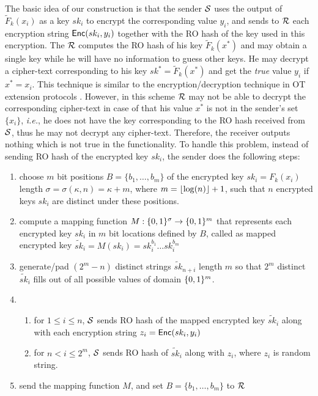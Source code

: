 The basic idea of our \OPPRF construction is that the sender $\mathcal{S}$ uses the output of $\widetilde F_k(x_i)$ as a key $sk_i$ to encrypt the corresponding value $y_i$, and sends to $\mathcal{R}$ each encryption string $\mathsf{Enc}(sk_i,y_i)$ together with the RO hash of the key used in this encryption.  The $\mathcal{R}$ computes the RO hash of his key $\widetilde F_k(x^*)$ and may obtain a single key while he will have no information to guess other keys. He may decrypt a cipher-text corresponding to his key $sk^*=\widetilde F_k(x^*)$ and get the \textit{true} value $y_i$ if $x^*=x_i$.   This technique is similar to the encryption/decryption technique in OT extension protocols \cite{C:IKNP03,C:KolKum13}. However, in this scheme $\mathcal{R}$ may not be able to decrypt the corresponding cipher-text in case of that his value $x^*$ is not in the sender's set $\{x_i\}$, \textit{i.e.},  he does not have the key corresponding to the RO hash received from $\mathcal{S}$, thus he may not decrypt any cipher-text. Therefore, the receiver outputs nothing which is not true in the \OPPRF functionality. To handle this problem, instead of sending RO hash of the encrypted key $sk_i$, the sender does the following steps:
\begin{enumerate}
	\item  choose $m$ bit positions $B=\{b_1,  \ldots, b_m\}$ of the encrypted key $sk_i=F_k(x_i)$ length $\sigma=\sigma(\kappa,n)=\kappa+m$, where $m={\lfloor{\log(n)}\rfloor}+1$, such that $n$ encrypted keys $sk_i$ are distinct under these positions.%
	\item compute a mapping function $M: \{0,1\}^\sigma \rightarrow \{0,1\}^m$ that represents each encrypted key $sk_i$ in $m$ bit locations defined by $B$, called as mapped encrypted key $\tilde{sk}_{i}=M(sk_i)=sk^{b_1}_i\ldots sk^{b_m}_i$
	\item generate/pad $(2^m-n)$ distinct strings $\tilde{sk}_{n+i}$ length $m$ so that $2^m$ distinct $\tilde{sk}_{i}$ fills out of all possible values of domain $\{0,1\}^m$.
	\item 
	\begin{enumerate}
		\item for $1\leq i \leq n$, $\mathcal{S}$ sends RO hash of the mapped encrypted key $\tilde{sk}_{i}$ along with each encryption string $z_i = \mathsf{Enc}(sk_i,y_i)$
		\item for $n < i \leq 2^m$, $\mathcal{S}$ sends RO hash of $\tilde{sk}_{i}$ along with $z_i$, where $z_i$ is random string.
	\end{enumerate}
	\item send the mapping function $M$, and set $B=\{b_1,  \ldots, b_m\}$	to $\mathcal{R}$
\end{enumerate}


